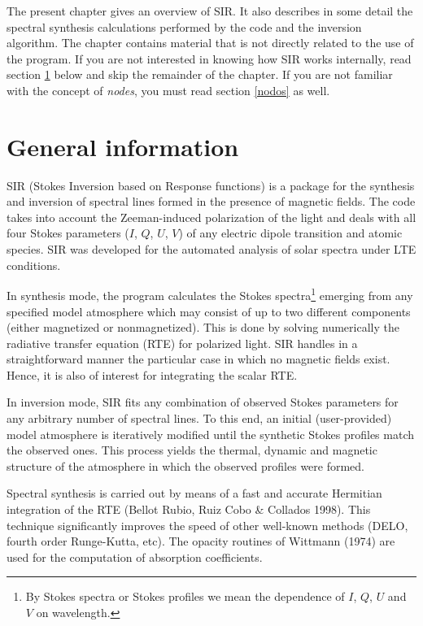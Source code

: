 The present chapter gives an overview of SIR. It also describes in 
some detail the spectral synthesis calculations performed by the code 
and the inversion algorithm. The chapter contains material that
is not directly related to the use of the program. If you are not 
interested in knowing how SIR works internally, read section \ref{general}
below and skip the remainder of the chapter. If you are not familiar with
the concept of {\em nodes}, you must read section \ref{nodos} as well.


\section{General information}
\label{general}
SIR (Stokes Inversion based on Response functions) is a package for the
synthesis and inversion of spectral lines formed in the presence of
magnetic fields. The code takes into account the Zeeman-induced
polarization of the light and deals with all four Stokes parameters
($I$, $Q$, $U$, $V$) of any electric dipole transition and atomic
species. SIR was developed for the automated analysis of solar spectra
under LTE conditions.

In synthesis mode, the program calculates the Stokes
spectra\footnote{By Stokes spectra or Stokes profiles we mean the
dependence of $I$, $Q$, $U$ and $V$ on wavelength.} emerging from any
specified model atmosphere which may consist of up to two different
components (either magnetized or nonmagnetized). This is done by
solving numerically the radiative transfer equation (RTE) for polarized
light. SIR handles in a straightforward manner the particular case in
which no magnetic fields exist. Hence, it is also of interest for
integrating the scalar RTE.

In inversion mode, SIR fits any combination of observed Stokes
parameters for any arbitrary number of spectral lines. To this end, an
initial (user-provided) model atmosphere is iteratively modified until
the synthetic Stokes profiles match the observed ones. This process
yields the thermal, dynamic and magnetic structure of the atmosphere in
which the observed profiles were formed.

Spectral synthesis is carried out by means of a fast and accurate
Hermitian integration of the RTE (Bellot Rubio, Ruiz Cobo \& Collados
1998). This technique significantly improves the speed of other
well-known methods (DELO, fourth order Runge-Kutta, etc).  The 
opacity routines of Wittmann (1974) are used for the computation 
of absorption coefficients.

